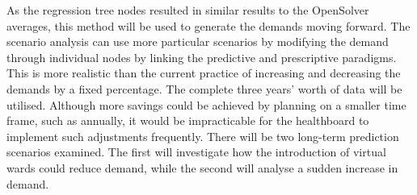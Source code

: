\documentclass[../thesis.tex]{subfiles}
\begin{document}



         




As the regression tree nodes resulted in similar results to the OpenSolver averages, this method will be used to generate the demands moving forward. The scenario analysis can use more particular scenarios by modifying the demand through individual nodes by linking the predictive and prescriptive paradigms. This is more realistic than the current practice of increasing and decreasing the demands by a fixed percentage. The complete three years' worth of data will be utilised. Although more savings could be achieved by planning on a smaller time frame, such as annually, it would be impracticable for the healthboard to implement such adjustments frequently. There will be two long-term prediction scenarios examined. The first will investigate how the introduction of virtual wards could reduce demand, while the second will analyse a sudden increase in demand.
\end{document}
